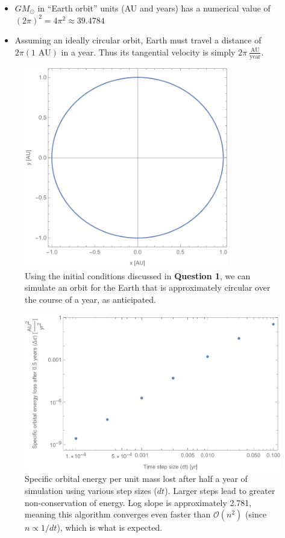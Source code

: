 \documentclass{article}
\begin{document}
\bigskip
{}
\medskip

\begin{itemize}
    \item $GM_\odot$ in ``Earth orbit'' units (AU and years) has a numerical value of $(2\pi)^2=4\pi^2\approx39.4784$
    \item Assuming an ideally circular orbit, Earth must travel a distance of $2\pi(1 \text{ AU})$ in a year. Thus its tangential velocity is simply $2\pi\ \frac{\text{AU}}{\text{year}}$.
\end{itemize}

\newpage
\bigskip
{}
\medskip

\begin{figure}[h!]
    \centering
    \includegraphics[width=3.5in]{homework3/q2_orbit.pdf}
    \caption{Using the initial conditions discussed in \textbf{Question 1}, we can simulate an orbit for the Earth that is approximately circular over the course of a year, as anticipated.}
    \label{fig:q2orbit}
\end{figure}

\begin{figure}[h!]
    \centering
    \includegraphics[width=5in]{homework3/q2_energyloss.pdf}
    \caption{Specific orbital energy per unit mass lost after half a year of simulation using various step sizes ($dt$). Larger steps lead to greater non-conservation of energy. Log slope is approximately 2.781, meaning this algorithm converges even faster than $\mathcal{O}(n^2)$ (since $n\propto1/dt$), which is what is expected.}
    \label{fig:q2energy}
\end{figure}
\end{document}
